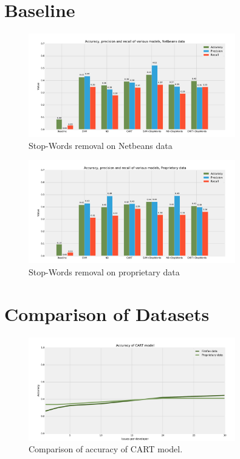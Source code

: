 \documentclass[nopalatino,nolot,nolof,color]{fithesis3}
\begin{document}
 \clearpage
 \section{Baseline}

 \begin{figure}[htbp]
    \centering
        \includegraphics[width=340px]{./images/comparison_of_models/netbeans_0.pdf}
    \caption{Stop-Words removal on Netbeans data}
    \label{fig:baseline.netbeans}
 \end{figure}

 \begin{figure}[htbp]
    \centering
        \includegraphics[width=340px]{./images/comparison_of_models/proprietary_0.pdf}
    \caption{Stop-Words removal on proprietary data}
    \label{fig:baseline.prop}
 \end{figure}

 \clearpage
 \section{Comparison of Datasets}

 \begin{figure}[htbp]
    \centering
        \includegraphics[width=340px]{./images/prop_vs_os/cart_accuracy.pdf}
    \caption{Comparison of accuracy of CART model.}
    \label{fig:results.datasets.cart_accuracy}
 \end{figure}
\end{document}
